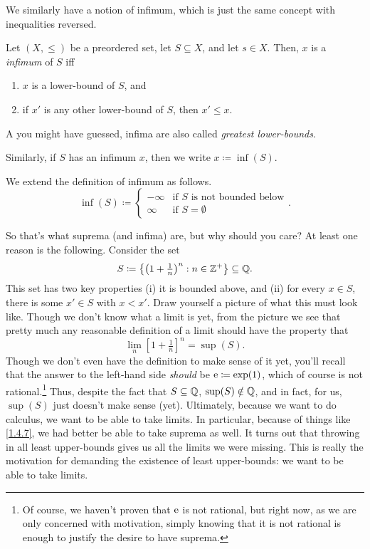 We similarly have a notion of infimum, which is just the same concept with inequalities reversed.
\begin{dfn}[Infimum]
Let $(X,\leq )$ be a preordered set, let $S\subseteq X$, and let $s\in X$.  Then, $x$ is a \emph{infimum} of $S$ iff
\begin{enumerate}
\item $x$ is a lower-bound of $S$, and
\item if $x'$ is any other lower-bound of $S$, then $x'\leq x$.
\end{enumerate}
\begin{rmk}
A you might have guessed, infima are also called \emph{greatest lower-bounds}.
\end{rmk}
\begin{rmk}
Similarly, if $S$ has an infimum $x$, then we write $x\coloneqq \inf (S)$.
\end{rmk}
We extend the definition of infimum as follows.
\begin{equation}
\inf (S)\coloneqq \begin{cases}-\infty & \text{if }S\text{ is not bounded below} \\ \infty & \text{if }S=\emptyset \end{cases}.
\end{equation}
\end{dfn}

So that's what suprema (and infima) are, but why should you care?  At least one reason is the following.  Consider the set
\begin{equation}
S\coloneqq \left\{ \left( 1+\tfrac{1}{n}\right) ^n:n\in \mathbb{Z} ^+\right\} \subseteq \mathbb{Q} .
\end{equation}
This set has two key properties (i) it is bounded above, and (ii) for every $x\in S$, there is some $x'\in S$ with $x<x'$.  Draw yourself a picture of what this must look like.  Though we don't know what a limit is yet, from the picture we see that pretty much any reasonable definition of a limit should have the property that
\begin{equation}\label{1.4.7}
\lim _n\left[ 1+\tfrac{1}{n}\right] ^n=\sup (S).
\end{equation}
Though we don't even have the definition to make sense of it yet, you'll recall that the answer to the left-hand side \emph{should} be $\mathrm{e} \coloneqq \exp (1)$, which of course is not rational.\footnote{Of course, we haven't proven that $\mathrm{e}$ is not rational, but right now, as we are only concerned with motivation, simply knowing that it is not rational is enough to justify the desire to have suprema.}  Thus, despite the fact that $S\subseteq \mathbb{Q}$, $\sup (S)\notin \mathbb{Q}$, and in fact, for us, $\sup (S)$ just doesn't make sense (yet).  Ultimately, because we want to do calculus, we want to be able to take limits.  In particular, because of things like \eqref{1.4.7}, we had better be able to take suprema as well.  It turns out that throwing in all least upper-bounds gives us all the limits we were missing.  This is really the motivation for demanding the existence of least upper-bounds:  we want to be able to take limits.

